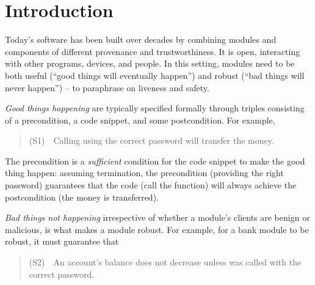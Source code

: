 \section{Introduction}
\label{s:intro}

Today's   software has been built 
over decades by combining modules and components of
different provenance and 
trustworthiness. It 
is open, interacting with other programs, devices, and people.
In this 
setting, modules need to be both useful (``good things
will eventually happen'') and  %
robust (``bad things will never happen'') %
-- to paraphrase   
 on liveness and safety.

\emph{Good things happening} are typically specified formally 
 through  triples consisting of a  precondition, a code snippet, and some
 postcondition.
 For example,
 \begin{quote}
(S1)\ \ Calling  using the correct password will transfer the money.
\end{quote}
The precondition is a \emph{sufficient} condition for the code snippet to make
the good thing happen: 
assuming termination, the precondition (\eg providing the right 
password) guarantees that
the code (\eg call the  function)
will always achieve the postcondition (the money is transferred).

\emph{Bad things not happening}
   irrespective of whether a module's clients are benign or malicious, is what makes a module  robust. 
{For example}, for a bank module to 
be robust, it must 
guarantee  that

\begin{quote}
(S2)\ \ An account's balance does not decrease unless  was called 
with the correct password.
\end{quote}

